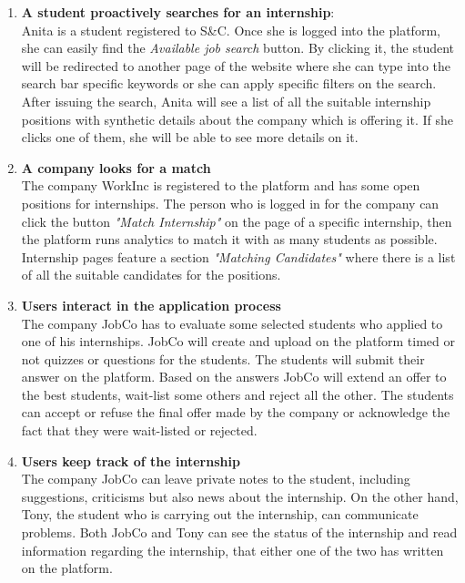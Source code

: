 \begin{enumerate}
            \item \textbf{A student proactively searches for an internship}:  
            \\Anita is a student registered to S\&C. Once she is logged into the platform, she can easily find the \textit{Available job search} button. By clicking it, the student will be redirected to another page of the website where she can type into the search bar specific keywords or she can apply specific filters on the search. After issuing the search, Anita will see a list of all the suitable internship positions with synthetic details about the company which is offering it. If she clicks one of them, she will be able to see more details on it.
            
            \item \textbf{A company looks for a match}   
            \\The company WorkInc is registered to the platform and has some open positions for internships. The person who is logged in for the company can click the button \textit{"Match Internship"} on the page of a specific internship, then the platform runs analytics to match it with as many students as possible. Internship pages feature a section \textit{"Matching Candidates"} where there is a list of all the suitable candidates for the positions. 
            
            \item \textbf{Users interact in the application process}
            \\ The company JobCo has to evaluate some selected students who applied to one of his internships. JobCo will create and upload on the platform timed or not quizzes or questions for the students. The students will submit their answer on the platform. Based on the answers JobCo will extend an offer to the best students, wait-list some others and reject all the other. The students can accept or refuse the final offer made by the company or acknowledge the fact that they were wait-listed or rejected.
            
            \item \textbf{Users keep track of the internship }
            \\ The company JobCo can leave private notes to the student, including suggestions, criticisms but also news about the internship. On the other hand, Tony, the student who is carrying out the internship, can communicate problems. Both JobCo and Tony can see the status of the internship and read information regarding the internship, that either one of the two has written on the platform.
            
        \end{enumerate}
        
